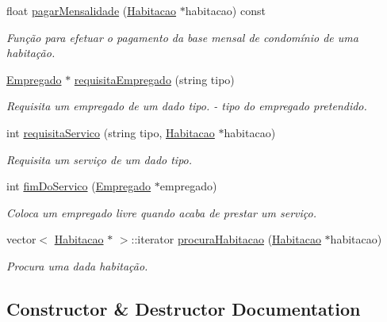 \begin{DoxyCompactItemize}
float \hyperlink{class_condominio_a16747ea7d4e1b442b1985725f5a9aeab}{pagar\+Mensalidade} (\hyperlink{class_habitacao}{Habitacao} $\ast$habitacao) const 
\begin{DoxyCompactList}\small\item\em Função para efetuar o pagamento da base mensal de condomínio de uma habitação. \end{DoxyCompactList}\item 
\hyperlink{class_empregado}{Empregado} $\ast$ \hyperlink{class_condominio_a5eec0c5c3a1cb566332431939bcbcb56}{requisita\+Empregado} (string tipo)
\begin{DoxyCompactList}\small\item\em Requisita um empregado de um dado tipo.  -\/ tipo do empregado pretendido. \end{DoxyCompactList}\item 
int \hyperlink{class_condominio_adb5c91a9114dbc1c0f3c8c3e9f835152}{requisita\+Servico} (string tipo, \hyperlink{class_habitacao}{Habitacao} $\ast$habitacao)
\begin{DoxyCompactList}\small\item\em Requisita um serviço de um dado tipo. \end{DoxyCompactList}\item 
int \hyperlink{class_condominio_af2c2cdd83d43ea6641542efe01ff94b9}{fim\+Do\+Servico} (\hyperlink{class_empregado}{Empregado} $\ast$empregado)
\begin{DoxyCompactList}\small\item\em Coloca um empregado livre quando acaba de prestar um serviço. \end{DoxyCompactList}\item 
vector$<$ \hyperlink{class_habitacao}{Habitacao} $\ast$ $>$\+::iterator \hyperlink{class_condominio_a19d0973b7485841e6b1be8a242367e9c}{procura\+Habitacao} (\hyperlink{class_habitacao}{Habitacao} $\ast$habitacao)
\begin{DoxyCompactList}\small\item\em Procura uma dada habitação. \end{DoxyCompactList}\end{DoxyCompactItemize}


\subsection{Constructor \& Destructor Documentation}
